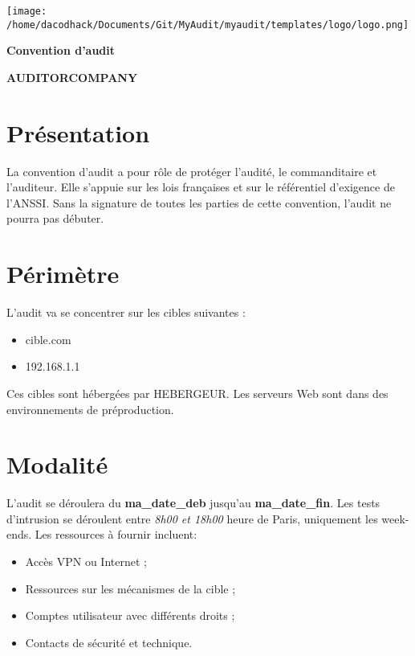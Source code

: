 \documentclass[12pt]{extarticle}
\begin{document}
\begin{titlepage}
    \centering
    \vspace*{3cm}
    \texttt{[image: /home/dacodhack/Documents/Git/MyAudit/myaudit/templates/logo/logo.png]}\par
    \vspace{1cm}
    {\Huge\bfseries Convention d'audit \par}
    \vspace{2cm}
    {\Large \bfseries AUDITORCOMPANY \par}
    \vfill
    \vspace{2cm}
\end{titlepage}

\newpage
\section*{Présentation}
La convention d’audit a pour rôle de protéger l’audité, le commanditaire et l’auditeur. Elle s’appuie sur les lois françaises et sur le référentiel d’exigence de l’ANSSI. Sans la signature de toutes les parties de cette convention, l’audit ne pourra pas débuter.

\newpage
\section*{Périmètre}
L’audit va se concentrer sur les cibles suivantes :
\begin{itemize}
    \item cible.com
    \item 192.168.1.1
\end{itemize}

Ces cibles sont hébergées par {{HEBERGEUR}}. Les serveurs Web sont dans des environnements de préproduction.

\newpage
\section*{Modalité}
L’audit se déroulera du \textbf{ma\_date\_deb} jusqu’au \textbf{ma\_date\_fin}. Les tests d’intrusion se déroulent entre \textit{8h00 et 18h00} heure de Paris, uniquement les week-ends. Les ressources à fournir incluent:
\begin{itemize}
    \item Accès VPN ou Internet ;
    \item Ressources sur les mécanismes de la cible ;
    \item Comptes utilisateur avec différents droits ;
    \item Contacts de sécurité et technique.
\end{itemize}
\end{document}
